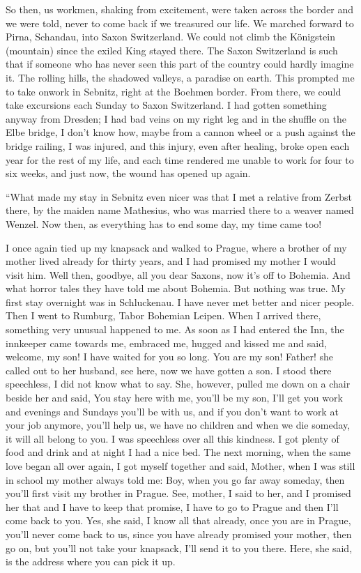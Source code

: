 So then, us workmen, shaking from excitement, were taken across the border and we were told, never to come back if we treasured our life. We marched forward to Pirna, Schandau, into Saxon Switzerland. We could not climb the Königstein (mountain) since the exiled King stayed there. The Saxon Switzerland is such that if someone who has never seen this part of the country could hardly imagine it. The rolling hills, the shadowed valleys, a paradise on earth. This prompted me to take onwork in Sebnitz, right at the Boehmen border. From there, we could take excursions each Sunday to Saxon Switzerland. I had gotten something anyway from Dresden; I had bad veins on my right leg and in the shuffle on the Elbe bridge, I don't know how, maybe from a cannon wheel or a push against the bridge railing, I was injured, and this injury, even after healing, broke open each year for the rest of my life, and each time rendered me unable to work for four to six weeks, and just now, the wound has opened up again.

``What made my stay in Sebnitz even nicer was that I met a relative from Zerbst there, by the maiden name Mathesius, who was married there to a weaver named Wenzel. Now then, as everything has to end some day, my time came too!

I once again tied up my knapsack and walked to Prague, where a brother of my mother lived already for thirty years, and I had promised my mother I would visit him. Well then, goodbye, all you dear Saxons, now it's off to Bohemia. And what horror tales they have told me about Bohemia. But nothing was true. My first stay overnight was in Schluckenau. I have never met better and nicer people. Then I went to Rumburg, Tabor Bohemian Leipen. When I arrived there, something very unusual happened to me. As soon as I had entered the Inn, the innkeeper came towards me, embraced me, hugged and kissed me and said, welcome, my son! I have waited for you so long. You are my son! Father! she called out to her husband, see here, now we have gotten a son. I stood there speechless, I did not know what to say. She, however, pulled me down on a chair beside her and said, You stay here with me, you'll be my son, I'll get you work and evenings and Sundays you'll be with us, and if you don't want to work at your job anymore, you'll help us, we have no children and when we die someday, it will all belong to you. I was speechless over all this kindness. I got plenty of food and drink and at night I had a nice bed. The next morning, when the same love began all over again, I got myself together and said, Mother, when I was still in school my mother always told me: Boy, when you go far away someday, then you'll first visit my brother in Prague. See, mother, I said to her, and I promised her that and I have to keep that promise, I have to go to Prague and then I'll come back to you. Yes, she said, I know all that already, once you are in Prague, you'll never come back to us, since you have already promised your mother, then go on, but you'll not take your knapsack, I'll send it to you there. Here, she said, is the address where you can pick it up.

